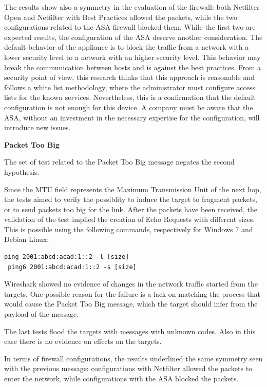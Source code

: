 \documentclass[12pt]{article}
\begin{document}
The results show also a symmetry in the evaluation of the firewall: both Netfilter Open and Netfilter with Best Practices allowed the packets, while the two configurations related to the ASA firewall blocked them. While the first two are expected results, the configuration of the ASA deserve another consideration. The default behavior of the appliance is to block the traffic from a network with a lower security level to a network with an higher security level. This behavior may break the communication between hosts and is against the best practices. From a security point of view, this research thinks that this approach is reasonable and follows a white list methodology, where the administrator must configure access lists for the known services. Nevertheless, this is a confirmation that the default configuration is not enough for this device. A company must be aware that the ASA, without an investment in the necessary expertise for the configuration, will introduce new issues.


\textbf{Packet Too Big}

The set of test related to the Packet Too Big message negates the second hypothesis.

Since the MTU field represents the Maximum Transmission Unit of the next hop, the tests aimed to verify the possiblity to induce the target to fragment packets, or to send packets too big for the link. After the packets have been received, the validation of the test implied the creation of Echo Requests with different sizes. This is possible using the following commands, respectively for Windows 7 and Debian Linux:
\begin{lstlisting}[style=python,basicstyle=\ttfamily\small]
 ping 2001:abcd:acad:1::2 -l [size]
 ping6 2001:abcd:acad:1::2 -s [size]
\end{lstlisting}
\vspace{-15pt}
Wireshark showed no evidence of changes in the network traffic started from the targets. One possible reason for the failure is a lack on matching the process that would cause the Packet Too Big message, which the target should infer from the payload of the message.

The last tests flood the targets with messages with unknown codes. Also in this case there is no evidence on effects on the targets.

In terms of firewall configurations, the results underlined the same symmetry seen with the previous message: configurations with Netfilter allowed the packets to enter the network, while configurations with the ASA blocked the packets.
\end{document}
